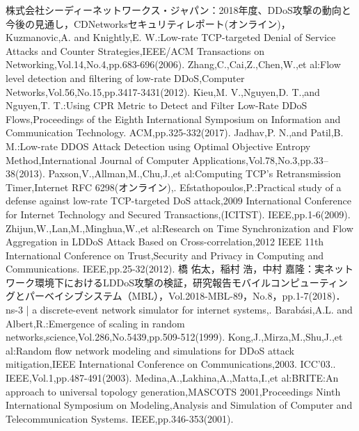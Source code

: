 \documentclass[Japanese]{dicomopapers}
\begin{document}
\begin{thebibliography}{99}
     株式会社シーディーネットワークス・ジャパン：2018年度、DDoS攻撃の動向と今後の見通し，CDNetworksセキュリティレポート(オンライン)，
     Kuzmanovic,A. and Knightly,E. W.:Low-rate TCP-targeted Denial of Service Attacks and Counter Strategies,IEEE/ACM Transactions on Networking,Vol.14,No.4,pp.683-696(2006).
     Zhang,C.,Cai,Z.,Chen,W.,et al:Flow level detection and filtering of low-rate DDoS,Computer Networks,Vol.56,No.15,pp.3417-3431(2012).
     Kieu,M. V.,Nguyen,D. T.,and Nguyen,T. T.:Using CPR Metric to Detect and Filter Low-Rate DDoS Flows,Proceedings of the Eighth International Symposium on Information and Communication Technology. ACM,pp.325-332(2017).
     Jadhav,P. N.,and Patil,B. M.:Low-rate DDOS Attack Detection using Optimal Objective Entropy Method,International Journal of Computer Applications,Vol.78,No.3,pp.33–38(2013).
     Paxson,V.,Allman,M.,Chu,J.,et al:Computing TCP's Retransmission Timer,Internet RFC 6298(オンライン),.
     Efstathopoulos,P.:Practical study of a defense against low-rate TCP-targeted DoS attack,2009 International Conference for Internet Technology and Secured Transactions,(ICITST). IEEE,pp.1-6(2009).
     Zhijun,W.,Lan,M.,Minghua,W.,et al:Research on Time Synchronization and Flow Aggregation in LDDoS Attack Based on Cross-correlation,2012 IEEE 11th International Conference on Trust,Security and Privacy in Computing and Communications. IEEE,pp.25-32(2012).
     橋 佑太，稲村 浩，中村 嘉隆：実ネットワーク環境下におけるLDDoS攻撃の検証，研究報告モバイルコンピューティングとパーベイシブシステム（MBL），Vol.2018-MBL-89，No.8，pp.1-7(2018)．
     ns-3 | a discrete-event network simulator for internet systems,.
     Barab{\'a}si,A.L. and Albert,R.:Emergence of scaling in random networks,science,Vol.286,No.5439,pp.509-512(1999).
     Kong,J.,Mirza,M.,Shu,J.,et al:Random flow network modeling and simulations for DDoS attack mitigation,IEEE International Conference on Communications,2003. ICC'03.. IEEE,Vol.1,pp.487-491(2003).
     Medina,A.,Lakhina,A.,Matta,I.,et al:BRITE:An approach to universal topology generation,MASCOTS 2001,Proceedings Ninth International Symposium on Modeling,Analysis and Simulation of Computer and Telecommunication Systems. IEEE,pp.346-353(2001).

\end{thebibliography}
\end{document}
